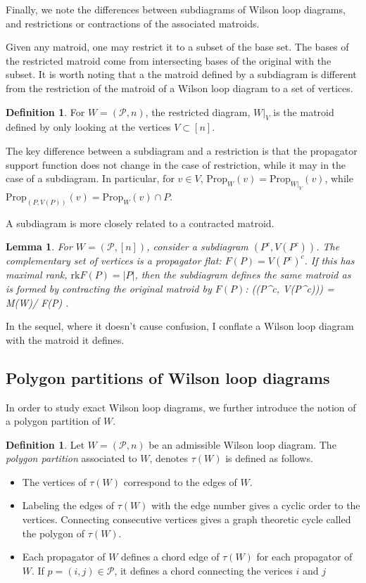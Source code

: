\documentclass[11pt]{article}
\newcommand{\rk}{\textrm{rk}}
\def\bas #1\eas{\begin{align*} #1 \end{align*}}
\newcommand{\cP}{\mathcal{P}}
\newcommand{\Prop}{\textrm{Prop}}
\newtheorem{lem}[thm]{Lemma}
\theoremstyle{remark}
\theoremstyle{definition}
\newtheorem{dfn}[thm]{Definition}
\begin{document}
Finally, we note the differences between subdiagrams of Wilson loop diagrams, and restrictions or contractions of the associated matroids. 

Given any matroid, one may restrict it to a subset of the base set. The bases of the restricted matroid come from intersecting bases of the original with the subset. It is worth noting that a the matroid defined by a subdiagram is different from the restriction of the matroid of a Wilson loop diagram to a set of vertices.

\begin{dfn} \label{restrictiondfn}
For $W = (\cP, n)$, the restricted diagram, $W|_V$ is the matroid defined by only looking at the vertices $V \subset [n]$.
\end{dfn}

The key difference between a subdiagram and a restriction is that the propagator support function does not change in the case of restriction, while it may in the case of a subdiagram. In particular, for $v \in V$, $\Prop_W(v) = \Prop_{W|_V}(v)$, while $\Prop_{(P, V(P))} (v) = \Prop_W(v) \cap P$.

A subdiagram is more closely related to a contracted matroid.

\begin{lem} \label{contractsubdiaglem}
For $W = (\cP, [n])$, consider a subdiagram $(P^c, V(P^c))$. The complementary set of vertices is a propagator flat: $F(P) = V(P^c)^c$. If this has maximal rank, $\rk F(P) = |P|$, then the subdiagram defines the same matroid as is formed by contracting the original matroid by $F(P)$: \bas M((P^c, V(P^c))) = M(W)/ F(P) \;. \eas
\end{lem} 

In the sequel, where it doesn't cause confusion, I conflate a Wilson loop diagram with the matroid it defines.

\subsection{Polygon partitions of Wilson loop diagrams}

In order to study exact Wilson loop diagrams, we further introduce the notion of a polygon partition of $W$.

\begin{dfn}
  Let $W = (\cP, n)$ be an admissible Wilson loop diagram.  The \emph{polygon partition} associated to $W$, denotes $\tau(W)$ is defined as follows.
  \begin{itemize}
  \item The vertices of $\tau(W)$ correspond to the edges of $W$. 
  \item Labeling the edges of $\tau(W)$ with the edge number gives a cyclic order to the vertices. Connecting consecutive vertices gives a graph theoretic cycle called the polygon of $\tau(W)$.
  \item Each propagator of $W$ defines a chord edge of $\tau(W)$ for each propagator of $W$.  If $p= (i,j) \in \cP$, it defines a chord connecting the verices $i$ and $j$
  \end{itemize}
\end{dfn}
\end{document}
